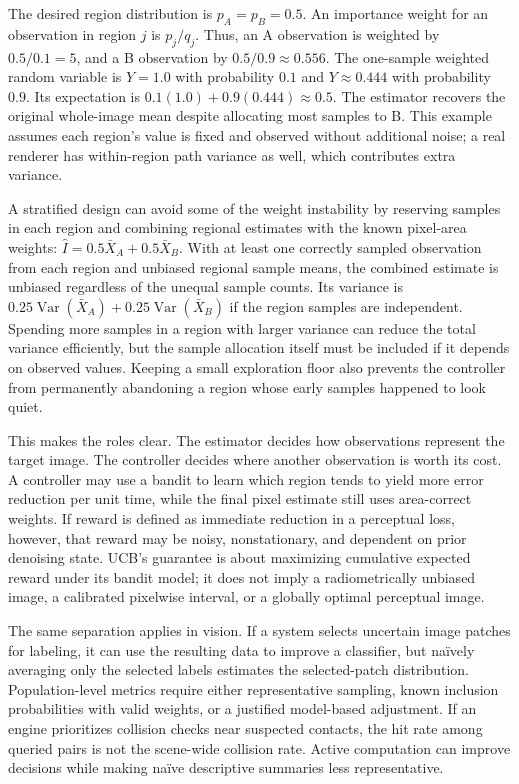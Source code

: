 The desired region distribution is \(p_A=p_B=0.5\). An importance weight for an observation in region \(j\) is \(p_j/q_j\). Thus, an A observation is weighted by \(0.5/0.1=5\), and a B observation by \(0.5/0.9\approx0.556\). The one-sample weighted random variable is \(Y=1.0\) with probability \(0.1\) and \(Y\approx0.444\) with probability \(0.9\). Its expectation is \(0.1(1.0)+0.9(0.444)\approx0.5\). The estimator recovers the original whole-image mean despite allocating most samples to B. This example assumes each region's value is fixed and observed without additional noise; a real renderer has within-region path variance as well, which contributes extra variance.

A stratified design can avoid some of the weight instability by reserving samples in each region and combining regional estimates with the known pixel-area weights: \(\hat I=0.5\bar X_A+0.5\bar X_B\). With at least one correctly sampled observation from each region and unbiased regional sample means, the combined estimate is unbiased regardless of the unequal sample counts. Its variance is \(0.25\operatorname{Var}(\bar X_A)+0.25\operatorname{Var}(\bar X_B)\) if the region samples are independent. Spending more samples in a region with larger variance can reduce the total variance efficiently, but the sample allocation itself must be included if it depends on observed values. Keeping a small exploration floor also prevents the controller from permanently abandoning a region whose early samples happened to look quiet.

This makes the roles clear. The estimator decides how observations represent the target image. The controller decides where another observation is worth its cost. A controller may use a bandit to learn which region tends to yield more error reduction per unit time, while the final pixel estimate still uses area-correct weights. If reward is defined as immediate reduction in a perceptual loss, however, that reward may be noisy, nonstationary, and dependent on prior denoising state. UCB's guarantee is about maximizing cumulative expected reward under its bandit model; it does not imply a radiometrically unbiased image, a calibrated pixelwise interval, or a globally optimal perceptual image.

The same separation applies in vision. If a system selects uncertain image patches for labeling, it can use the resulting data to improve a classifier, but naïvely averaging only the selected labels estimates the selected-patch distribution. Population-level metrics require either representative sampling, known inclusion probabilities with valid weights, or a justified model-based adjustment. If an engine prioritizes collision checks near suspected contacts, the hit rate among queried pairs is not the scene-wide collision rate. Active computation can improve decisions while making naïve descriptive summaries less representative.

